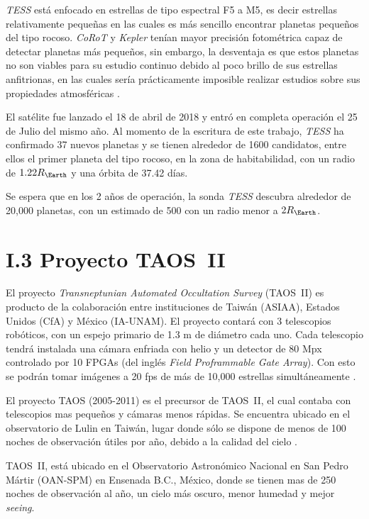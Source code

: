 \textit{TESS} está enfocado en estrellas de tipo espectral F5 a M5, es decir estrellas relativamente pequeñas en las cuales es más sencillo encontrar planetas pequeños del tipo rocoso. \textit{CoRoT} y \textit{Kepler} tenían mayor precisión fotométrica capaz de detectar planetas más pequeños, sin embargo, la desventaja es que estos planetas no son viables para su estudio continuo debido al poco brillo de sus estrellas anfitrionas, en las cuales sería prácticamente imposible realizar estudios sobre sus propiedades atmosféricas \citep{sullivan2015transiting}. 

El satélite fue lanzado el 18 de abril de 2018 y entró en completa operación el 25 de Julio del mismo año. Al momento de la escritura de este trabajo, \textit{TESS} ha confirmado 37 nuevos planetas y se tienen alrededor de 1600 candidatos, entre ellos el primer planeta del tipo rocoso, en la zona de habitabilidad, con un radio de $1.22R_{\Earth}$ y una órbita de 37.42 días. \cite{gilbert2020first}

Se espera que en los 2 años de operación, la sonda \textit{TESS} descubra alrededor de 20,000 planetas, con un estimado de 500 con un radio menor a $2R_{\Earth}$.

\section*{I.3 Proyecto TAOS~II}

El proyecto \textit{Transneptunian Automated Occultation Survey} (TAOS~II) es producto de la colaboración entre instituciones de Taiwán (ASIAA), Estados Unidos (CfA) y México (IA-UNAM). El proyecto contará con 3 telescopios robóticos, con un espejo primario de 1.3 m de diámetro cada uno. Cada telescopio tendrá instalada una cámara enfriada con helio y un detector de 80 Mpx controlado por 10 FPGAs (del inglés \textit{Field Proframmable Gate Array}). Con esto se podrán tomar imágenes a 20 fps de más de 10,000 estrellas simultáneamente \cite{lehner2012transneptunian}.

El proyecto TAOS (2005-2011) es el precursor de TAOS~II, el cual contaba con telescopios mas pequeños y cámaras menos rápidas. Se encuentra ubicado en el observatorio de Lulin en Taiwán, lugar donde sólo se dispone de menos de 100 noches de observación útiles por año, debido a la calidad del cielo \citep{lehner2010taos}.

TAOS~II, está ubicado en el Observatorio Astronómico Nacional en San Pedro Mártir (OAN-SPM) en Ensenada B.C., México, donde se tienen mas de 250 noches de observación al año, un cielo más oscuro, menor humedad y mejor \textit{seeing}.

